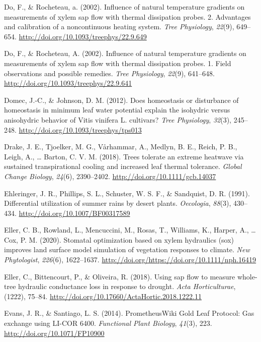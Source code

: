 \documentclass[11pt,twoside]{reedthesis}
\begin{document}
\hypertarget{ref-Do2002}{}
Do, F., \& Rocheteau, a. (2002). Influence of natural temperature
gradients on measurements of xylem sap flow with thermal dissipation
probes. 2. Advantages and calibration of a noncontinuous heating system.
\emph{Tree Physiology}, \emph{22}(9), 649--654.
\url{http://doi.org/10.1093/treephys/22.9.649}

\hypertarget{ref-Do2002b}{}
Do, F., \& Rocheteau, A. (2002). Influence of natural temperature
gradients on measurements of xylem sap flow with thermal dissipation
probes. 1. Field observations and possible remedies. \emph{Tree
Physiology}, \emph{22}(9), 641--648.
\url{http://doi.org/10.1093/treephys/22.9.641}

\hypertarget{ref-domec_does_2012}{}
Domec, J.-C., \& Johnson, D. M. (2012). Does homeostasis or disturbance
of homeostasis in minimum leaf water potential explain the isohydric
versus anisohydric behavior of Vitis vinifera L. cultivars? \emph{Tree
Physiology}, \emph{32}(3), 245--248.
\url{http://doi.org/10.1093/treephys/tps013}

\hypertarget{ref-drake_trees_2018}{}
Drake, J. E., Tjoelker, M. G., Vårhammar, A., Medlyn, B. E., Reich, P.
B., Leigh, A., \ldots{} Barton, C. V. M. (2018). Trees tolerate an
extreme heatwave via sustained transpirational cooling and increased
leaf thermal tolerance. \emph{Global Change Biology}, \emph{24}(6),
2390--2402. \url{http://doi.org/10.1111/gcb.14037}

\hypertarget{ref-ehleringer_differential_1991}{}
Ehleringer, J. R., Phillips, S. L., Schuster, W. S. F., \& Sandquist, D.
R. (1991). Differential utilization of summer rains by desert plants.
\emph{Oecologia}, \emph{88}(3), 430--434.
\url{http://doi.org/10.1007/BF00317589}

\hypertarget{ref-Eller2020}{}
Eller, C. B., Rowland, L., Mencuccini, M., Rosas, T., Williams, K.,
Harper, A., \ldots{} Cox, P. M. (2020). Stomatal optimization based on
xylem hydraulics (sox) improves land surface model simulation of
vegetation responses to climate. \emph{New Phytologist}, \emph{226}(6),
1622--1637. \url{http://doi.org/https://doi.org/10.1111/nph.16419}

\hypertarget{ref-eller_using_2018}{}
Eller, C., Bittencourt, P., \& Oliveira, R. (2018). Using sap flow to
measure whole-tree hydraulic conductance loss in response to drought.
\emph{Acta Horticulturae}, (1222), 75--84.
\url{http://doi.org/10.17660/ActaHortic.2018.1222.11}

\hypertarget{ref-evans_prometheuswiki_2014}{}
Evans, J. R., \& Santiago, L. S. (2014). PrometheusWiki Gold Leaf
Protocol: Gas exchange using LI-COR 6400. \emph{Functional Plant
Biology}, \emph{41}(3), 223. \url{http://doi.org/10.1071/FP10900}
\end{document}
